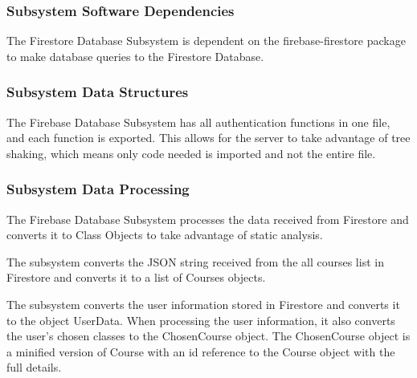 \subsubsection{Subsystem Software Dependencies}
The Firestore Database Subsystem is dependent on the firebase-firestore package to make database queries to the Firestore Database.


\subsubsection{Subsystem Data Structures}
The Firebase Database Subsystem has all authentication functions in one file, and each function is exported. This allows for the server to take advantage of tree shaking, which means only code needed is imported and not the entire file.

\subsubsection{Subsystem Data Processing}
The Firebase Database Subsystem processes the data received from Firestore and converts it to Class Objects to take advantage of static analysis.

The subsystem converts the JSON string received from the all courses list in Firestore and converts it to a list of Courses objects.

The subsystem converts the user information stored in Firestore and converts it to the object UserData. When processing the user information, it also converts the user's chosen classes to the ChosenCourse object. The ChosenCourse object is a minified version of Course with an id reference to the Course object with the full details.
